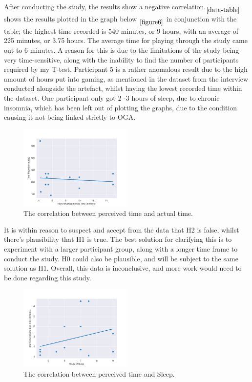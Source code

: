 \documentclass[conference]{IEEEtran}
\begin{document}
After conducting the study, the results show a negative correlation.$ _{\ref{data-table}}$ shows the results plotted in the graph below $_{\ref{figure6}}$ in conjunction with the table; the highest time recorded is 540 minutes, or 9 hours, with an average of 225
 minutes, or 3.75 hours. The average time for playing through the study came out to 6 minutes. A reason for this is due to the limitations of the study being very time-sensitive, along with the inability to find the number of participants required by my T-test. Participant 5 is a rather anomalous result due to the high amount of hours put into gaming, as mentioned in the dataset from the interview conducted alongside the artefact, whilst having the lowest recorded time within the dataset. One participant only got 2 -3 hours of sleep, due to chronic insomnia, which has been left out of plotting the graphs, due to the condition causing it not being linked strictly to OGA.

\begin{figure}[H]
\includegraphics[width = 0.5\textwidth]{Graph1}
\caption{The correlation between perceived time and actual time.}
\label{figure6}
\end{figure}

It is within reason to suspect and accept from the data that H2 is false, whilst there's plausibility that H1 is true. The best solution for clarifying this is to experiment with a larger participant group, along with a longer time frame to conduct the study. H0 could also be plausible, and will be subject to the same solution as H1. Overall, this data is inconclusive, and more work would need to be done regarding this study.

\begin{figure}[H]
\includegraphics[width = 0.5\textwidth]{Graph2}
\caption{The correlation between perceived time and Sleep.}
\label{figure7}
\end{figure}
\end{document}
